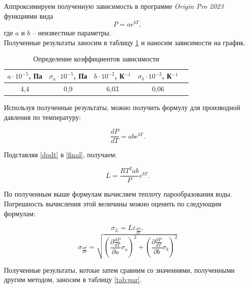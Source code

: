 \documentclass[a4paper, 12pt]{article}
\begin{document}
    \noindent Аппроксимируем полученную зависимость в программе \textit{Origin Pro 2023} функциями вида \[ P=ae^{bT}, \] где $a$ и $b$ -- неизвестные параметры. \\

    \noindent Полученные результаты заносим в таблицу \ref{tab:ab} и наносим зависимости на график.

    \begin{table}[H]
	\centering
	\begin{tabular}{|c|c|c|c|c|}
		\hline
            $a \cdot 10^{-5}$, Па & $ \sigma_a \cdot 10^{-5}$, Па & $ b \cdot 10^{-2} $, К$ ^{-1} $ & $ \sigma_b \cdot 10^{-2} $, К$ ^{-1} $ \\ \hline
		4,4 & 0,9 & 6,03 & 0,06 \\ \hline
	\end{tabular}
	\caption{Определение коэффициентов зависимости}
	\label{tab:ab}
    \end{table}

    \noindent Используя полученные результаты, можно получить формулу для производной давления по температуру:
    
    \begin{equation}
        \label{dpdt}
        \frac{dP}{dT} = abe^{bT}.
    \end{equation}
    
    \noindent Подставляя \eqref{dpdt} в \eqref{final}, получаем:
    
    \begin{equation}
        \label{newFinal}
        L=\frac{RT^2ab}{P}e^{bT}.
    \end{equation}

    \noindent По полученным выше формулам вычисляем теплоту парообразования воды. Погрешность вычисления этой величины можно оценить по следующим формулам:
    
    \[ \sigma_L = L\varepsilon_{\frac{dP}{dT}}, \]
    \[ \sigma_{\frac{dP}{dT}} = \sqrt{\left(\frac{\partial\frac{dP}{dT}}{\partial a}\sigma_a\right)^2+\left(\frac{\partial\frac{dP}{dT}}{\partial b}\sigma_b\right)^2} \]

    \noindent Полученные результаты, котоые затем сравним со значениями, полученными  другим методом, заносим в таблицу \ref{tab:par}.
\end{document}
